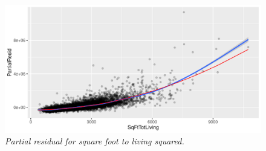 \documentclass[12pt,letterpaper]{article}
\begin{document}
\begin{figure}[!h]
	\includegraphics[width= 150mm]{SqrfTL^2ParRegRplot}
	\caption{\small \sl Partial residual for square foot to living squared.\label{fig:Stupendous}} 
\end{figure}

\newpage
\end{document}
